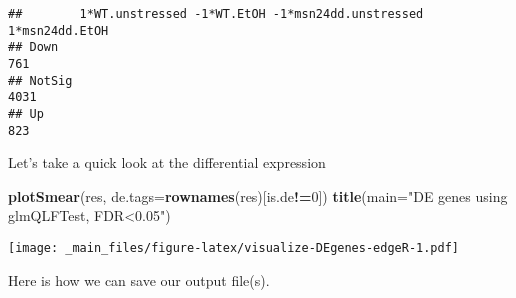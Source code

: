 \documentclass[
]{book}
\newenvironment{Shaded}{\begin{snugshade}}{\end{snugshade}}
\newcommand{\AttributeTok}[1]{\textcolor[rgb]{0.13,0.29,0.53}{#1}}
\newcommand{\DecValTok}[1]{\textcolor[rgb]{0.00,0.00,0.81}{#1}}
\newcommand{\FunctionTok}[1]{\textcolor[rgb]{0.13,0.29,0.53}{\textbf{#1}}}
\newcommand{\NormalTok}[1]{#1}
\newcommand{\SpecialCharTok}[1]{\textcolor[rgb]{0.81,0.36,0.00}{\textbf{#1}}}
\newcommand{\StringTok}[1]{\textcolor[rgb]{0.31,0.60,0.02}{#1}}
\begin{document}
\begin{verbatim}
##        1*WT.unstressed -1*WT.EtOH -1*msn24dd.unstressed 1*msn24dd.EtOH
## Down                                                               761
## NotSig                                                            4031
## Up                                                                 823
\end{verbatim}

Let's take a quick look at the differential expression

\begin{Shaded}
\begin{Highlighting}[]
\FunctionTok{plotSmear}\NormalTok{(res, }\AttributeTok{de.tags=}\FunctionTok{rownames}\NormalTok{(res)[is.de}\SpecialCharTok{!=}\DecValTok{0}\NormalTok{])}
\FunctionTok{title}\NormalTok{(}\AttributeTok{main=}\StringTok{"DE genes using glmQLFTest, FDR\textless{}0.05"}\NormalTok{)}
\end{Highlighting}
\end{Shaded}

\texttt{[image: \_main\_files/figure-latex/visualize-DEgenes-edgeR-1.pdf]}

Here is how we can save our output file(s).
\end{document}

